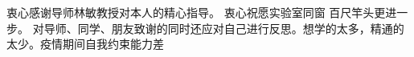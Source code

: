\begin{acknowledgement}
    衷心感谢导师林敏教授对本人的精心指导。
    衷心祝愿实验室同窗 百尺竿头更进一步。
    对导师、同学、朋友致谢的同时还应对自己进行反思。想学的太多，精通的太少。疫情期间自我约束能力差
\end{acknowledgement}
